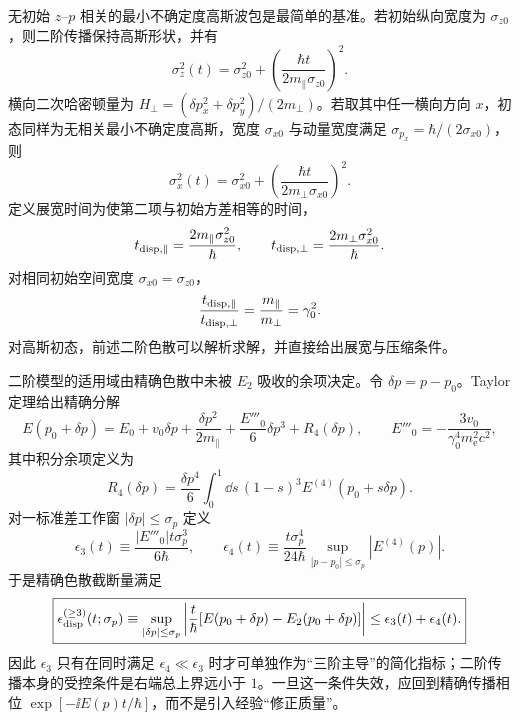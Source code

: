 无初始 $z$--$p$ 相关的最小不确定度高斯波包是最简单的基准。若初始纵向宽度为 $\sigma_{z0}$，则二阶传播保持高斯形状，并有
\[
\sigma_z^2(t)
=\sigma_{z0}^2+
\left(\frac{\hbar t}{2m_\parallel\sigma_{z0}}\right)^2.
\]
横向二次哈密顿量为 $H_\perp=(\delta p_x^2+\delta p_y^2)/(2m_\perp)$。若取其中任一横向方向 $x$，初态同样为无相关最小不确定度高斯，宽度 $\sigma_{x0}$ 与动量宽度满足 $\sigma_{p_x}=\hbar/(2\sigma_{x0})$，则
\[
\sigma_x^2(t)
=\sigma_{x0}^2+
\left(\frac{\hbar t}{2m_\perp\sigma_{x0}}\right)^2.
\]
定义展宽时间为使第二项与初始方差相等的时间，
\[
t_{\rm disp,\parallel}
=\frac{2m_\parallel\sigma_{z0}^2}{\hbar},
\qquad
t_{\rm disp,\perp}
=\frac{2m_\perp\sigma_{x0}^2}{\hbar}.
\]
对相同初始空间宽度 $\sigma_{x0}=\sigma_{z0}$，
\[
\frac{t_{\rm disp,\parallel}}{t_{\rm disp,\perp}}
=\frac{m_\parallel}{m_\perp}=\gamma_0^2.
\]
对高斯初态，前述二阶色散可以解析求解，并直接给出展宽与压缩条件。

二阶模型的适用域由精确色散中未被 $E_2$ 吸收的余项决定。令 $\delta p=p-p_0$。Taylor 定理给出精确分解
\[
E(p_0+\delta p)
=E_0+v_0\delta p+\frac{\delta p^2}{2m_\parallel}
+\frac{E'''_0}{6}\delta p^3+R_4(\delta p),
\qquad
E'''_0=-\frac{3v_0}{\gamma_0^4m_{\mathrm e}^2c^2},
\]
其中积分余项定义为
\[
R_4(\delta p)
=\frac{\delta p^4}{6}
\int_0^1\dd s\,(1-s)^3
E^{(4)}(p_0+s\delta p).
\]
对一标准差工作窗 $|\delta p|\le\sigma_p$ 定义
\[
\epsilon_3(t)
\equiv\frac{|E'''_0|t\sigma_p^3}{6\hbar},
\qquad
\epsilon_4(t)
\equiv
\frac{t\sigma_p^4}{24\hbar}
\sup_{|p-p_0|\le\sigma_p}|E^{(4)}(p)|.
\]
于是精确色散截断量满足
\begin{equation}
\boxed{
\epsilon_{\rm disp}^{(\ge3)}(t;\sigma_p)
\equiv
\sup_{|\delta p|\le\sigma_p}
\left|\frac{t}{\hbar}[E(p_0+\delta p)-E_2(p_0+\delta p)]\right|
\le\epsilon_3(t)+\epsilon_4(t).}
\label{eq:electron_dispersion_cubic_control}
\end{equation}
因此 $\epsilon_3$ 只有在同时满足 $\epsilon_4\ll\epsilon_3$ 时才可单独作为“三阶主导”的简化指标；二阶传播本身的受控条件是右端总上界远小于 $1$。一旦这一条件失效，应回到精确传播相位 $\exp[-\ii E(p)t/\hbar]$，而不是引入经验“修正质量”。

